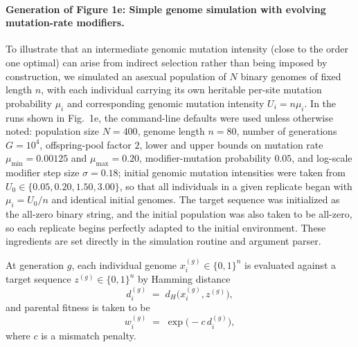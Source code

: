 {\paragraph{Generation of Figure 1e: Simple genome simulation with evolving mutation-rate modifiers.}
To illustrate that an intermediate genomic mutation intensity (close to the order one optimal) can arise from indirect selection rather than being imposed by construction, we simulated an asexual population of $N$ binary genomes of fixed length $n$, with each individual carrying its own heritable per-site mutation probability $\mu_i$ and corresponding genomic mutation intensity $U_i=n\mu_i$. In the runs shown in Fig.~1e, the command-line defaults were used unless otherwise noted: population size $N=400$, genome length $n=80$, number of generations $G=10^4$, offspring-pool factor $2$, lower and upper bounds on mutation rate $\mu_{\min}=0.00125$ and $\mu_{\max}=0.20$, modifier-mutation probability $0.05$, and log-scale modifier step size $\sigma=0.18$; initial genomic mutation intensities were taken from $U_0\in\{0.05,0.20,1.50,3.00\}$, so that all individuals in a given replicate began with $\mu_i=U_0/n$ and identical initial genomes. The target sequence was initialized as the all-zero binary string, and the initial population was also taken to be all-zero, so each replicate begins perfectly adapted to the initial environment. These ingredients are set directly in the simulation routine and argument parser. 

At generation $g$, each individual genome $x_i^{(g)}\in\{0,1\}^n$ is evaluated against a target sequence $z^{(g)}\in\{0,1\}^n$ by Hamming distance
\[
d_i^{(g)} \;=\; d_H\!\bigl(x_i^{(g)},z^{(g)}\bigr),
\]
and parental fitness is taken to be
\[
w_i^{(g)} \;=\; \exp\!\bigl(-c\, d_i^{(g)}\bigr),
\]
where $c$ is a mismatch penalty. 

}
